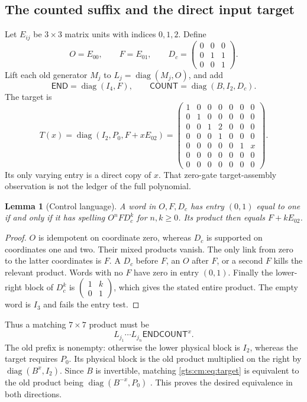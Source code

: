 \documentclass[11pt,letterpaper]{article}
\newtheorem{lemma}[theorem]{Lemma}
\theoremstyle{definition}
\theoremstyle{remark}
\newcommand{\diag}{\operatorname{diag}}
\newcommand{\END}{\mathsf{END}}
\newcommand{\COUNT}{\mathsf{COUNT}}
\begin{document}
\subsection{The counted suffix and the direct input target}
Let $E_{ij}$ be $3\times3$ matrix units with indices $0,1,2$. Define
\[
 O=E_{00},\qquad F=E_{01},\qquad
 D_c=\begin{pmatrix}0&0&0\\0&1&1\\0&0&1\end{pmatrix}.
\]
Lift each old generator $M_j$ to $L_j=\diag(M_j,O)$, and add
\[
 \END=\diag(I_4,F),\qquad
 \COUNT=\diag(B,I_2,D_c).
\]
The target is
\begin{equation}\label{gts:cm:eq:target}
 T(x)=\diag(I_2,P_0,F+xE_{02})
 =\begin{pmatrix}
 1&0&0&0&0&0&0\\
 0&1&0&0&0&0&0\\
 0&0&1&2&0&0&0\\
 0&0&0&1&0&0&0\\
 0&0&0&0&0&1&x\\
 0&0&0&0&0&0&0\\
 0&0&0&0&0&0&0
 \end{pmatrix}.
\end{equation}
Its only varying entry is a direct copy of $x$. That zero-gate target-assembly observation is not the ledger of the full polynomial.

\begin{lemma}[Control language]\label{gts:cm:lem:control}
A word in $O,F,D_c$ has entry $(0,1)$ equal to one if and only if it has spelling $O^nFD_c^k$ for $n,k\ge0$. Its product then equals $F+kE_{02}$.
\end{lemma}
\begin{proof}
$O$ is idempotent on coordinate zero, whereas $D_c$ is supported on coordinates one and two. Their mixed products vanish. The only link from zero to the latter coordinates is $F$. A $D_c$ before $F$, an $O$ after $F$, or a second $F$ kills the relevant product. Words with no $F$ have zero in entry $(0,1)$. Finally the lower-right block of $D_c^k$ is $\left(\begin{smallmatrix}1&k\\0&1\end{smallmatrix}\right)$, which gives the stated entire product. The empty word is $I_3$ and fails the entry test.
\end{proof}
Thus a matching $7\times7$ product must be
\[
 L_{j_1}\cdots L_{j_n}\END\COUNT^x.
\]
The old prefix is nonempty: otherwise the lower physical block is $I_2$, whereas the target requires $P_0$. Its physical block is the old product multiplied on the right by $\diag(B^x,I_2)$. Since $B$ is invertible, matching \eqref{gts:cm:eq:target} is equivalent to the old product being $\diag(B^{-x},P_0)$ \cite{cm-counted}. This proves the desired equivalence in both directions.
\end{document}
